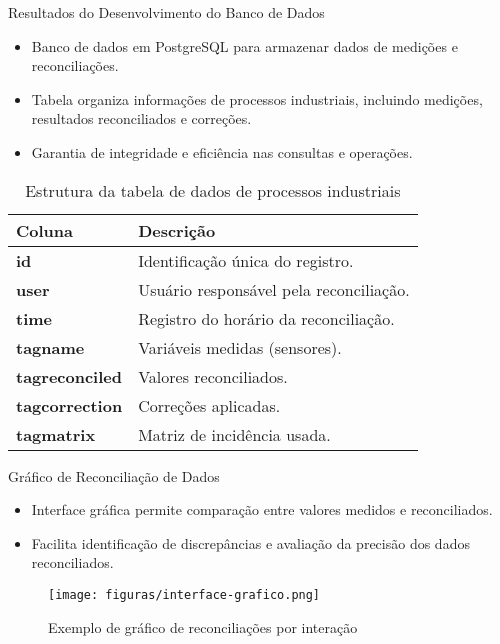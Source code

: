 \begin{frame}{Resultados do Desenvolvimento do Banco de Dados}
    \begin{itemize}
        \item Banco de dados em PostgreSQL para armazenar dados de medições e reconciliações.
        \item Tabela organiza informações de processos industriais, incluindo medições, resultados reconciliados e correções.
        \item Garantia de integridade e eficiência nas consultas e operações.
    \end{itemize}
    \begin{table}[htbp!]
        \centering
        \begin{tabular}{|l|p{6cm}|}
            \hline
            \textbf{Coluna} & \textbf{Descrição} \\ \hline
            \textbf{id} & Identificação única do registro. \\ \hline
            \textbf{user} & Usuário responsável pela reconciliação. \\ \hline
            \textbf{time} & Registro do horário da reconciliação. \\ \hline
            \textbf{tagname} & Variáveis medidas (sensores). \\ \hline
            \textbf{tagreconciled} & Valores reconciliados. \\ \hline
            \textbf{tagcorrection} & Correções aplicadas. \\ \hline
            \textbf{tagmatrix} & Matriz de incidência usada. \\ \hline
        \end{tabular}
        \caption{Estrutura da tabela de dados de processos industriais}
    \end{table}
\end{frame}

\begin{frame}{Gráfico de Reconciliação de Dados}
    \begin{itemize}
        \item Interface gráfica permite comparação entre valores medidos e reconciliados.
        \item Facilita identificação de discrepâncias e avaliação da precisão dos dados reconciliados.
    \end{itemize}
    \begin{figure}
        \centering
        \texttt{[image: figuras/interface-grafico.png]}
        \caption{Exemplo de gráfico de reconciliações por interação}
    \end{figure}
\end{frame}
